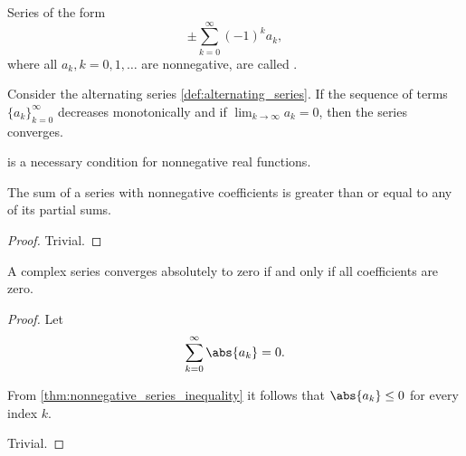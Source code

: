 \begin{definition}\label{def:alternating_series}
  Series of the form
  \begin{equation}\label{def:alternating_series/series}
    \pm \sum_{k=0}^\infty (-1)^k a_k,
  \end{equation}
  where all \( a_k, k = 0, 1, \ldots \) are nonnegative, are called .
\end{definition}

\begin{proposition}\label{thm:leibniz_alternating_series_test}
  Consider the alternating series \cref{def:alternating_series}. If the sequence of terms \( \{ a_k \}_{k=0}^\infty \) decreases monotonically and if \( \lim_{k \to \infty} a_k = 0 \), then the series converges.
\end{proposition}

\begin{theorem}\label{thm:weierstrass_series_criterion_nessessity}
   is a necessary condition for nonnegative real functions.
\end{theorem}

\begin{proposition}\label{thm:nonnegative_series_inequality}
  The sum of a series with nonnegative coefficients is greater than or equal to any of its partial sums.
\end{proposition}
\begin{proof}
  Trivial.
\end{proof}

\begin{corollary}\label{thm:absolute_convergence_to_zero}
  A complex series converges absolutely to zero if and only if all coefficients are zero.
\end{corollary}
\begin{proof}
  \SufficiencySubProof Let
  \begin{equation*}
    \sum_{k=0}^\infty \abs{a_k} = 0.
  \end{equation*}

  From \cref{thm:nonnegative_series_inequality} it follows that \( \abs{a_k} \leq 0 \) for every index \( k \).

  \NecessitySubProof Trivial.
\end{proof}
